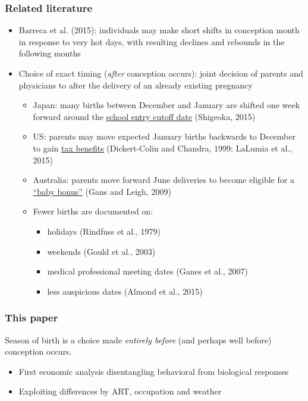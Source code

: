 \documentclass[10pt,letterpaper,subeqn]{beamer}
\begin{document}
\begin{frame}
\frametitle{Related literature}
\begin{itemize}
\item Barreca et al. (2015): individuals may make short shifts in conception month in response to very hot days, with resulting declines and rebounds in the following months
\item Choice of exact timing (\emph{after} conception occurs): joint decision of parents and physicians to alter the delivery of an already existing pregnancy
\begin{itemize}
\item Japan: many births between December and January are shifted one week forward around the \underline{school entry cutoff date} (Shigeoka, 2015)
\item US: parents may move expected January births backwards to December to gain \underline{tax benefits} (Dickert-Colin and Chandra, 1999; LaLumia et al., 2015)
\item Australia: parents move forward June deliveries to become eligible for a \underline{``baby bonus''} (Gans and Leigh, 2009)
\item Fewer births are documented on:
\begin{itemize}
\item holidays (Rindfuss et al., 1979)
\item weekends (Gould et al., 2003)
\item medical professional meeting dates (Ganes et al., 2007)
\item less auspicious dates (Almond et al., 2015)
\end{itemize}
\end{itemize}
\end{itemize}
\end{frame}

\begin{frame}
\frametitle{This paper}

Season of birth is a choice made \emph{entirely before} (and perhaps well before) conception occurs.
\vspace{4mm}
\begin{itemize}
\item First economic analysis disentangling behavioral from biological responses
\item Exploiting differences by ART, occupation and weather
\end{itemize}
\end{frame}
\end{document}

